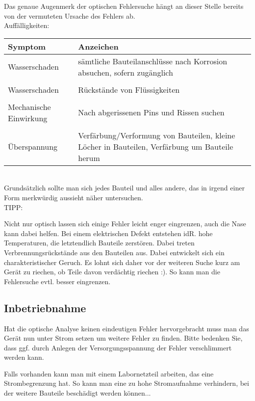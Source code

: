 Das genaue Augenmerk der optischen Fehlersuche hängt an dieser Stelle bereits von der vermuteten Ursache des Fehlers ab.\\

Auffälligkeiten:\\

\begin{tabular}{p{80pt}p{300pt}}
	
	Symptom & Anzeichen \\ 
	\hline 
	Wasserschaden & sämtliche Bauteilanschlüsse nach Korrosion absuchen, sofern zugänglich \\ \\
	Wasserschaden & Rückstände von Flüssigkeiten \\ \\
	Mechanische Einwirkung & Nach abgerissenen Pins und Rissen suchen \\ \\
	Überspannung & Verfärbung/Verformung von Bauteilen, kleine Löcher in Bauteilen, Verfärbung um Bauteile herum\\
	
\end{tabular} \\


Grundsätzlich sollte man sich jedes Bauteil und alles andere, das in irgend einer Form merkwürdig aussieht näher untersuchen.\\

TIPP:

Nicht nur optisch lassen sich einige Fehler leicht enger eingrenzen, auch die Nase kann dabei helfen.
Bei einem elektrischen Defekt entstehen idR. hohe Temperaturen, die letztendlich Bauteile zerstören. Dabei treten Verbrennungsrückstände aus den Bauteilen aus. Dabei entwickelt sich ein charakteristischer Geruch. Es lohnt sich daher vor der weiteren Suche kurz am Gerät zu riechen, ob Teile davon verdächtig riechen :). So kann man die Fehlersuche evtl. besser eingrenzen.

\subsection{Inbetriebnahme}

Hat die optische Analyse keinen eindeutigen Fehler hervorgebracht muss man das Gerät nun unter Strom setzen um weitere Fehler zu finden.
Bitte bedenken Sie, dass ggf. durch Anlegen der Versorgungsspannung der Fehler verschlimmert werden kann.

Falls vorhanden kann man mit einem Labornetzteil arbeiten, das eine Strombegrenzung hat.
So kann man eine zu hohe Stromaufnahme verhindern, bei der weitere Bauteile beschädigt werden können...

